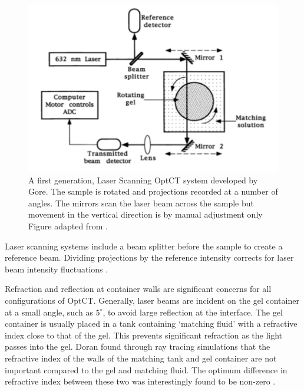  


\begin{figure}[H]
\centering
\includegraphics[scale=0.6]{Gore_setup.pdf}
\caption{A first generation,  Laser Scanning OptCT system developed by Gore. The sample is rotated and projections recorded at a number of angles. The  mirrors scan the laser beam across the sample but movement in the vertical direction is by manual adjustment only Figure adapted from \cite{Gore:1999tg}. }
\label{fig:gore_setup}
\end{figure}


Laser scanning systems include a  beam splitter before the sample to create a reference beam. Dividing projections by the reference intensity  corrects for laser beam intensity fluctuations \cite{Gore:1999tg}.

Refraction and reflection at container walls are significant concerns for all configurations of  OptCT. Generally, laser beams are incident on the gel container at a small angle, such as $5^{\circ}$, to avoid large reflection at the interface. The gel container is usually placed in a tank containing `matching fluid' with a refractive index close to that of the gel. This prevents significant refraction as the light passes into the gel. Doran found through ray tracing simulations that the refractive index of the walls of the matching tank and  gel container are not important compared to the gel and matching fluid. The optimum difference in refractive index between these two was interestingly found to be non-zero \cite{Doran:2001ee}. 

